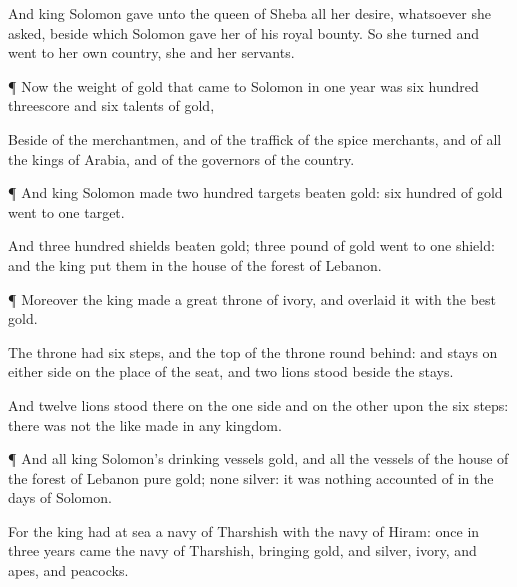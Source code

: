 {And
king
Solomon
gave unto the
queen of
Sheba all her
desire, whatsoever she
asked, beside
{} which
Solomon
gave her of his
royal
bounty. So she
turned and
went to her own
country, she and her
servants.


\par }{\PP {}¶ Now the
weight of
gold that
came to
Solomon in
one
year was
six
hundred
threescore and
six
talents of
gold,

Beside
{} of the
merchantmen, and of the
traffick of the spice
merchants, and of all the
kings of
Arabia, and of the
governors of the
country.


\par }{\PP {}¶ And
king
Solomon
made two
hundred
targets
{}
beaten
gold:
six
hundred
{} of
gold
went to
one
target.

And
{}
three
hundred
shields
{}
beaten
gold;
three
pound of
gold
went to
one
shield: and the
king
put them in the
house of the
forest of
Lebanon.


\par }{\PP {}¶ Moreover the
king
made a
great
throne of
ivory, and
overlaid it with the
best
gold.

The
throne had
six
steps, and the
top of the
throne
{}
round
behind: and
{}
stays on either side on the
place of the
seat, and
two
lions
stood
beside the
stays.

And
twelve
lions
stood there on the one side and on the other upon the
six
steps: there was not the
like
made in any
kingdom.


\par }{\PP {}¶ And all
king
Solomon’s
drinking
vessels
{}
gold, and all the
vessels of the
house of the
forest of
Lebanon
{}
pure
gold; none
{}
silver: it was
nothing
accounted of in the
days of
Solomon.

For the
king had at
sea a
navy of
Tharshish with the
navy of
Hiram:
once in
three
years
came the
navy of
Tharshish,
bringing
gold, and
silver,
ivory, and
apes, and
peacocks.

}
